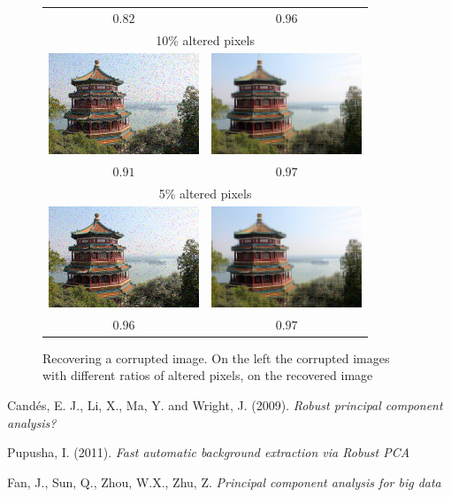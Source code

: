 \documentclass[a4paper]{article}
\begin{document}
\begin{figure}
\begin{tabular}{cc}
        $0.82$ & $0.96$ \\
        \multicolumn{2}{c}{10\% altered pixels} \\
        \includegraphics[width=45mm]{perturbed-1} & \includegraphics[width=45mm]{restored-1} \\
        $0.91$ & $0.97$ \\
        \multicolumn{2}{c}{5\% altered pixels} \\
        \includegraphics[width=45mm]{perturbed-05} & \includegraphics[width=45mm]{restored-05} \\
        $0.96$ & $0.97$ \\
    \end{tabular}
    \caption{Recovering a corrupted image. On the left the corrupted images with different ratios of altered pixels, on the recovered image}
    \label{experiment}
\end{figure}

\begin{thebibliography}{5}
    Candés, E. J., Li, X., Ma, Y. and Wright, J. (2009). \em{Robust principal component analysis?}

    Pupusha, I. (2011). \em{Fast automatic background extraction via Robust PCA}

    Fan, J., Sun, Q., Zhou, W.X., Zhu, Z. \em{Principal component analysis for big data}
\end{thebibliography}
\end{document}
